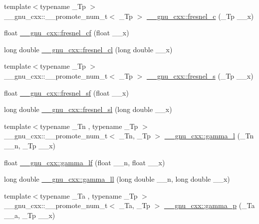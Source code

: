 \begin{DoxyCompactItemize}
\item 
{\footnotesize template$<$typename \+\_\+\+Tp $>$ }\\\+\_\+\+\_\+gnu\+\_\+cxx\+::\+\_\+\+\_\+promote\+\_\+num\+\_\+t$<$ \+\_\+\+Tp $>$ \hyperlink{group__gnu__math__spec__func_ga7ecb0071ad3172d53276a967f9b702fc}{\+\_\+\+\_\+gnu\+\_\+cxx\+::fresnel\+\_\+c} (\+\_\+\+Tp \+\_\+\+\_\+x)
\item 
float \hyperlink{group__gnu__math__spec__func_ga02ca7579d5aef96cba69e38e988e7a42}{\+\_\+\+\_\+gnu\+\_\+cxx\+::fresnel\+\_\+cf} (float \+\_\+\+\_\+x)
\item 
long double \hyperlink{group__gnu__math__spec__func_gaa3f82a7569d61c2f7c194d2e64b616f8}{\+\_\+\+\_\+gnu\+\_\+cxx\+::fresnel\+\_\+cl} (long double \+\_\+\+\_\+x)
\item 
{\footnotesize template$<$typename \+\_\+\+Tp $>$ }\\\+\_\+\+\_\+gnu\+\_\+cxx\+::\+\_\+\+\_\+promote\+\_\+num\+\_\+t$<$ \+\_\+\+Tp $>$ \hyperlink{group__gnu__math__spec__func_gaff40a89f169b1a8962ed0e75587c488b}{\+\_\+\+\_\+gnu\+\_\+cxx\+::fresnel\+\_\+s} (\+\_\+\+Tp \+\_\+\+\_\+x)
\item 
float \hyperlink{group__gnu__math__spec__func_ga73450b8fd4abd5d8d3191dd6cbcda808}{\+\_\+\+\_\+gnu\+\_\+cxx\+::fresnel\+\_\+sf} (float \+\_\+\+\_\+x)
\item 
long double \hyperlink{group__gnu__math__spec__func_ga5d6ac976fa316df9b943f92bafe1407d}{\+\_\+\+\_\+gnu\+\_\+cxx\+::fresnel\+\_\+sl} (long double \+\_\+\+\_\+x)
\item 
{\footnotesize template$<$typename \+\_\+\+Tn , typename \+\_\+\+Tp $>$ }\\\+\_\+\+\_\+gnu\+\_\+cxx\+::\+\_\+\+\_\+promote\+\_\+num\+\_\+t$<$ \+\_\+\+Tn, \+\_\+\+Tp $>$ \hyperlink{group__gnu__math__spec__func_gab3a75d57386806857b5f97c45b4ced6e}{\+\_\+\+\_\+gnu\+\_\+cxx\+::gamma\+\_\+l} (\+\_\+\+Tn \+\_\+\+\_\+n, \+\_\+\+Tp \+\_\+\+\_\+x)
\item 
float \hyperlink{group__gnu__math__spec__func_ga3afdb94b9c107fe72386899ad84bc532}{\+\_\+\+\_\+gnu\+\_\+cxx\+::gamma\+\_\+lf} (float \+\_\+\+\_\+n, float \+\_\+\+\_\+x)
\item 
long double \hyperlink{group__gnu__math__spec__func_ga80c72bee8364398f65c05e5147e03d80}{\+\_\+\+\_\+gnu\+\_\+cxx\+::gamma\+\_\+ll} (long double \+\_\+\+\_\+n, long double \+\_\+\+\_\+x)
\item 
{\footnotesize template$<$typename \+\_\+\+Ta , typename \+\_\+\+Tp $>$ }\\\+\_\+\+\_\+gnu\+\_\+cxx\+::\+\_\+\+\_\+promote\+\_\+num\+\_\+t$<$ \+\_\+\+Ta, \+\_\+\+Tp $>$ \hyperlink{group__gnu__math__spec__func_ga7b31929f8a2368cff4d4304e3fd8a7be}{\+\_\+\+\_\+gnu\+\_\+cxx\+::gamma\+\_\+p} (\+\_\+\+Ta \+\_\+\+\_\+a, \+\_\+\+Tp \+\_\+\+\_\+x)

\end{DoxyCompactItemize}

